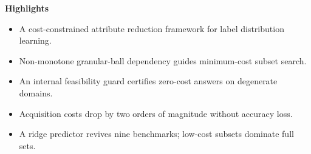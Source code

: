\documentclass[12pt]{article}
\begin{document}
\begin{center}{\Large\bfseries Highlights}\end{center}
\vspace{1em}

\begin{itemize}
\item A cost-constrained attribute reduction framework for label distribution learning.
\item Non-monotone granular-ball dependency guides minimum-cost subset search.
\item An internal feasibility guard certifies zero-cost answers on degenerate domains.
\item Acquisition costs drop by two orders of magnitude without accuracy loss.
\item A ridge predictor revives nine benchmarks; low-cost subsets dominate full sets.
\end{itemize}
\end{document}
